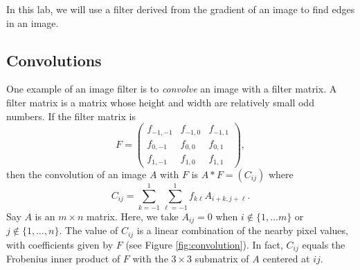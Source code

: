 In this lab, we will use a filter derived from the gradient of an image to find edges in an image.

\subsection*{Convolutions}
One example of an image filter is to \emph{convolve} an image with a filter matrix.
A filter matrix is a matrix whose height and width are relatively small odd numbers.
If the filter matrix is
\[
F = \begin{pmatrix}
f_{-1,-1}&f_{-1,0}&f_{-1,1}\\
f_{0,-1}&f_{0,0}&f_{0,1}\\
f_{1,-1}&f_{1,0}&f_{1,1}
\end{pmatrix},
\]
then the convolution of an image $A$ with $F$ is $A \ast F = (C_{ij})$ where
\begin{equation}\label{equ:convolve}
C_{ij} = \sum_{k=-1}^1 \sum_{\ell=-1}^1 f_{k\ell}A_{i+k,j+\ell}.
\end{equation}
Say $A$ is an $m \times n$ matrix. Here, we take $A_{ij}=0$ when $i \not \in \{1, \ldots m\}$ or $j \not \in \{1, \ldots, n\}$.
The value of $C_{ij}$ is a linear combination of the nearby pixel values, with coefficients given by $F$ (see Figure \ref{fig:convolution}).
In fact, $C_{ij}$ equals the Frobenius inner product of $F$ with the $3 \times 3$ submatrix of $A$ centered at $ij$.

